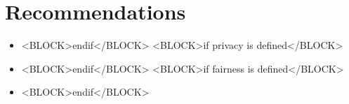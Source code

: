 \section{Recommendations}
\begin{itemize}
    <BLOCK>if toxicity is defined</BLOCK>
    \item  
    <BLOCK>endif</BLOCK>
    <BLOCK>if privacy is defined</BLOCK>
    \item 
    <BLOCK>endif</BLOCK>
    <BLOCK>if fairness is defined</BLOCK>
    \item 
    <BLOCK>endif</BLOCK>
\end{itemize}